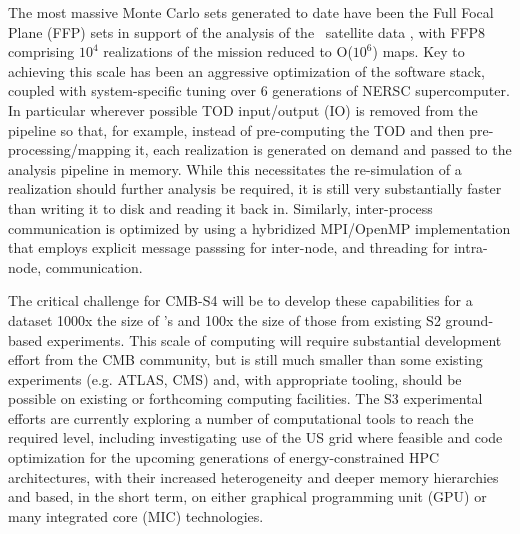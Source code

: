 The most massive Monte Carlo sets generated to date have been the Full Focal Plane (FFP) sets in support of the analysis of the \planck\ satellite data \cite{Ade:2015via}, with FFP8 comprising $10^4$ realizations of the mission reduced to O($10^6$) maps. Key to achieving this scale has been an aggressive optimization of the software stack, coupled with system-specific tuning over 6 generations of NERSC supercomputer. In particular wherever possible TOD input/output (IO) is removed from the pipeline so that, for example, instead of pre-computing the TOD and then pre-processing/mapping it, each realization is generated on demand and passed to the analysis pipeline in memory. While this necessitates the re-simulation of a realization should further analysis be required, it is still very substantially faster than writing it to disk and reading it back in. Similarly, inter-process communication is optimized by using a hybridized MPI/OpenMP implementation that employs explicit message passsing for inter-node, and threading for intra-node, communication.

The critical challenge for CMB-S4 will be to develop these capabilities for a dataset 1000x the size of \planck's and 100x the size of those from existing S2 ground-based experiments. This scale of computing will require substantial development effort from the CMB community, but is still much smaller than some existing experiments (e.g. ATLAS, CMS) and, with appropriate tooling, should be possible on existing or forthcoming computing facilities. The S3 experimental efforts are currently exploring a number of computational tools to reach the required level, including investigating use of the US grid where feasible and code optimization for the upcoming generations of energy-constrained HPC architectures, with their increased heterogeneity and deeper memory hierarchies and based, in the short term, on either graphical programming unit (GPU) or many integrated core (MIC) technologies.

%



